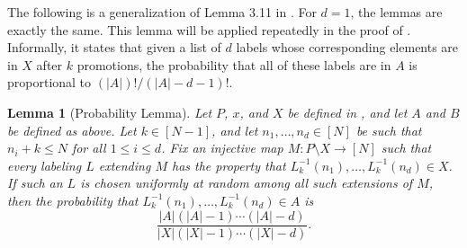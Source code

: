 \documentclass[11pt]{amsart}
\newtheorem{lemma}[thm]{Lemma}
\theoremstyle{definition}
\newcommand{\inverse}{^{-1}}
\begin{document}
The following is a generalization of Lemma 3.11 in \cite{DK20}. For $ d=1 $, the lemmas are exactly the same. This lemma will be applied repeatedly in the proof of . Informally, it states that given a list of $ d $ labels whose corresponding elements are in $ X $ after $ k $ promotions, the probability that all of these labels are in $ A $ is proportional to $ (|A|)!/(|A|-d-1)! $. 

\begin{lemma}[Probability Lemma]\label{probability lemma}
	Let $ P $, $ x $, and $ X $ be defined in , and let $ A $ and $ B $ be defined as above. Let $ k\in[N-1] $, and let $ n_1,\ldots,n_d\in[N] $ be such that $ n_i+k\leq N $ for all $ 1\leq i\leq d $. Fix an injective map $ M:P\setminus X\to[N] $ such that every labeling $ L $ extending $ M $ has the property that $ L_k\inverse(n_1),\ldots,L_k\inverse(n_d)\in X $. If such an $ L $ is chosen uniformly at random among all such extensions of $ M $, then the probability that $ L_k\inverse(n_1),\ldots,L_k\inverse(n_d)\in A $ is \[\frac{|A|(|A|-1)\cdots(|A|-d)}{|X|(|X|-1)\cdots(|X|-d)}.\] 
\end{lemma}
\end{document}

